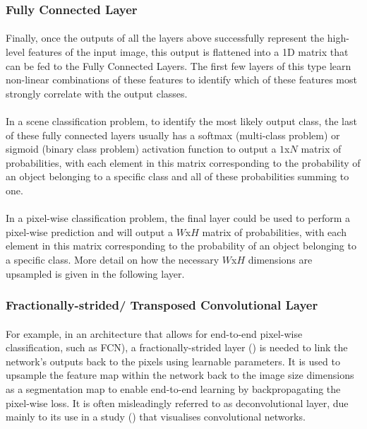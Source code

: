 \subsubsection{Fully Connected Layer}
\paragraph{}
Finally, once the outputs of all the layers above successfully represent the high-level features of the input image, this output is flattened into a 1D matrix that can be fed to the Fully Connected Layers. The first few layers of this type learn non-linear combinations of these features to identify which of these features most strongly correlate with the output classes.
\paragraph{}
In a scene classification problem, to identify the most likely output class, the last of these fully connected layers usually has a softmax (multi-class problem)  or sigmoid (binary class problem) activation function to output a $1$x$N$ matrix of probabilities, with each element in this matrix corresponding to the probability of an object belonging to a specific class and all of these probabilities summing to one.
\paragraph{}

In a pixel-wise classification problem, the final layer could be used to perform a pixel-wise prediction and will output a $W$x$H$ matrix of probabilities, with each element in this matrix corresponding to the probability of an object belonging to a specific class. More detail on how the necessary $W$x$H$ dimensions are upsampled is given in the following layer.

\subsubsection{Fractionally-strided/ Transposed Convolutional Layer}
\paragraph{}
For example, in an architecture that allows for end-to-end pixel-wise classification, such as \gls{FCN}), a fractionally-strided layer (\cite{long2015fully}) is needed to link the network's outputs back to the pixels  using learnable parameters. It is used to upsample the feature map within the network back to the image size dimensions as a segmentation map to enable end-to-end learning by backpropagating the pixel-wise loss. It is often misleadingly  referred to as deconvolutional layer, due mainly to its use in a study (\cite{zeiler2013visualizing}) that visualises convolutional networks. 

